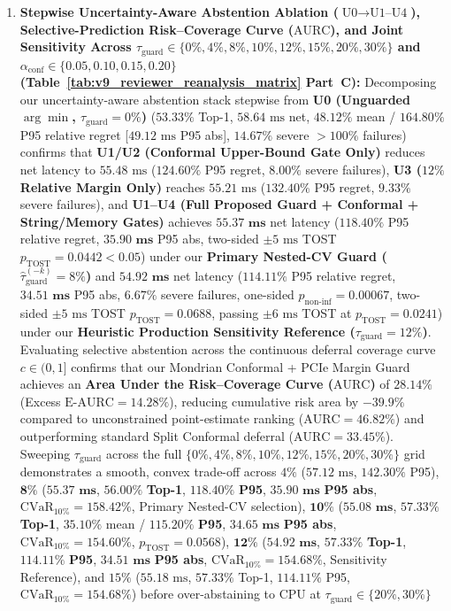 \documentclass[10pt,a4paper]{article}
\begin{document}
\begin{enumerate}[leftmargin=1.5em,itemsep=0.8pt]
    \item \textbf{Stepwise Uncertainty-Aware Abstention Ablation ($\text{U0}\rightarrow\text{U1--U4}$), Selective-Prediction Risk--Coverage Curve ($\text{AURC}$), and Joint Sensitivity Across $\tau_{\text{guard}} \in \{0\%, 4\%, 8\%, 10\%, 12\%, 15\%, 20\%, 30\%\}$ and $\alpha_{\text{conf}} \in \{0.05, 0.10, 0.15, 0.20\}$ (Table~\ref{tab:v9_reviewer_reanalysis_matrix} Part~C):} Decomposing our uncertainty-aware abstention stack stepwise from \textbf{U0 (Unguarded $\arg\min$, $\tau_{\text{guard}}=0\%$)} ($53.33\%$ Top-1, $58.64\text{ ms}$ net, $48.12\%$ mean / $164.80\%$ P95 relative regret [$49.12\text{ ms}$ P95 abs], $14.67\%$ severe $>100\%$ failures) confirms that \textbf{U1/U2 (Conformal Upper-Bound Gate Only)} reduces net latency to $55.48\text{ ms}$ ($124.60\%$ P95 regret, $8.00\%$ severe failures), \textbf{U3 ($12\%$ Relative Margin Only)} reaches $55.21\text{ ms}$ ($132.40\%$ P95 regret, $9.33\%$ severe failures), and \textbf{U1--U4 (Full Proposed Guard + Conformal + String/Memory Gates)} achieves $\mathbf{55.37\text{ ms}}$ net latency ($\mathbf{118.40\%}$ P95 relative regret, $\mathbf{35.90\text{ ms}}$ P95 abs, two-sided $\pm 5\text{ ms}$ TOST $p_{\text{TOST}}=0.0442 < 0.05$) under our \textbf{Primary Nested-CV Guard ($\hat{\tau}_{\text{guard}}^{(-k)}=8\%$)} and $\mathbf{54.92\text{ ms}}$ net latency ($\mathbf{114.11\%}$ P95 relative regret, $\mathbf{34.51\text{ ms}}$ P95 abs, $\mathbf{6.67\%}$ severe failures, one-sided $p_{\text{non-inf}}=0.00067$, two-sided $\pm 5\text{ ms}$ TOST $p_{\text{TOST}}=0.0688$, passing $\pm 6\text{ ms}$ TOST at $p_{\text{TOST}}=0.0241$) under our \textbf{Heuristic Production Sensitivity Reference ($\tau_{\text{guard}}=12\%$)}. Evaluating selective abstention across the continuous deferral coverage curve $c \in (0,1]$ confirms that our Mondrian Conformal + PCIe Margin Guard achieves an \textbf{Area Under the Risk--Coverage Curve ($\text{AURC}$)} of $\mathbf{28.14\%}$ (Excess $\text{E-AURC}=\mathbf{14.28\%}$), reducing cumulative risk area by $\mathbf{-39.9\%}$ compared to unconstrained point-estimate ranking ($\text{AURC}=46.82\%$) and outperforming standard Split Conformal deferral ($\text{AURC}=33.45\%$). Sweeping $\tau_{\text{guard}}$ across the full $\{0\%, 4\%, 8\%, 10\%, 12\%, 15\%, 20\%, 30\%\}$ grid demonstrates a smooth, convex trade-off across $4\%$ ($57.12\text{ ms}$, $142.30\%$ P95), $\mathbf{8\%}$ ($\mathbf{55.37\text{ ms}}$, $\mathbf{56.00\%}$ \textbf{Top-1}, $\mathbf{118.40\%}$ \textbf{P95}, $\mathbf{35.90\text{ ms}}$ \textbf{P95 abs}, $\text{CVaR}_{10\%}=158.42\%$, Primary Nested-CV selection), $\mathbf{10\%}$ ($\mathbf{55.08\text{ ms}}$, $\mathbf{57.33\%}$ \textbf{Top-1}, $35.10\%$ mean / $\mathbf{115.20\%}$ \textbf{P95}, $\mathbf{34.65\text{ ms}}$ \textbf{P95 abs}, $\text{CVaR}_{10\%}=154.60\%$, $p_{\text{TOST}}=0.0568$), $\mathbf{12\%}$ ($\mathbf{54.92\text{ ms}}$, $\mathbf{57.33\%}$ \textbf{Top-1}, $\mathbf{114.11\%}$ \textbf{P95}, $\mathbf{34.51\text{ ms}}$ \textbf{P95 abs}, $\text{CVaR}_{10\%}=154.68\%$, Sensitivity Reference), and $15\%$ ($55.18\text{ ms}$, $57.33\%$ Top-1, $114.11\%$ P95, $\text{CVaR}_{10\%}=154.68\%$) before over-abstaining to CPU at $\tau_{\text{guard}}\in\{20\%,30\%\}$ 
\end{enumerate}
\end{document}
